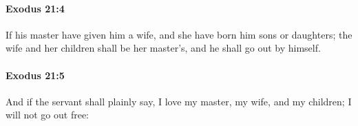 		\paragraph{Exodus 21:4} %
			\label{EXODUS-21-4}

			If his master have given him a wife, and she have born him sons or daughters; the wife and her children shall be her master's, and he shall go out by himself.


		\paragraph{Exodus 21:5} %
			\label{EXODUS-21-5}

			And if the servant shall plainly say, I love my master, my wife, and my children; I will not go out free:


